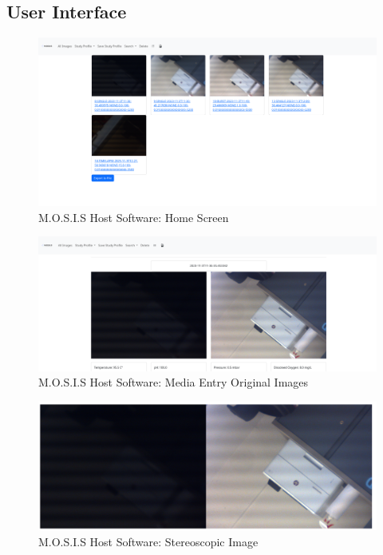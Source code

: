 \documentclass[12pt]{article}
\begin{document}
\subsection{User Interface}
\begin{figure}[H]
	\includegraphics[width=\textwidth]{Figures/index_view.png}
	\caption{M.O.S.I.S Host Software: Home Screen}
\end{figure}
\begin{figure}[H]
	\includegraphics[width=\textwidth]{Figures/left_right_images_media_enty.png}
	\caption{M.O.S.I.S Host Software: Media Entry Original Images}
\end{figure}
\begin{figure}[H]
	\includegraphics[width=\textwidth]{Figures/stereoscopic_image.png}
	\caption{M.O.S.I.S Host Software: Stereoscopic Image}
\end{figure}
\end{document}
